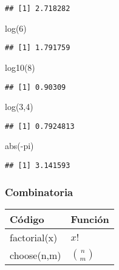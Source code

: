 \documentclass[
]{article}
\newenvironment{Shaded}{\begin{snugshade}}{\end{snugshade}}
\newcommand{\DecValTok}[1]{\textcolor[rgb]{0.00,0.00,0.81}{#1}}
\newcommand{\FunctionTok}[1]{\textcolor[rgb]{0.00,0.00,0.00}{#1}}
\newcommand{\NormalTok}[1]{#1}
\newcommand{\SpecialCharTok}[1]{\textcolor[rgb]{0.00,0.00,0.00}{#1}}
\begin{document}
\begin{verbatim}
## [1] 2.718282
\end{verbatim}

\begin{Shaded}
\begin{Highlighting}[]
\FunctionTok{log}\NormalTok{(}\DecValTok{6}\NormalTok{)}
\end{Highlighting}
\end{Shaded}

\begin{verbatim}
## [1] 1.791759
\end{verbatim}

\begin{Shaded}
\begin{Highlighting}[]
\FunctionTok{log10}\NormalTok{(}\DecValTok{8}\NormalTok{)}
\end{Highlighting}
\end{Shaded}

\begin{verbatim}
## [1] 0.90309
\end{verbatim}

\begin{Shaded}
\begin{Highlighting}[]
\FunctionTok{log}\NormalTok{(}\DecValTok{3}\NormalTok{,}\DecValTok{4}\NormalTok{)}
\end{Highlighting}
\end{Shaded}

\begin{verbatim}
## [1] 0.7924813
\end{verbatim}

\begin{Shaded}
\begin{Highlighting}[]
\FunctionTok{abs}\NormalTok{(}\SpecialCharTok{{-}}\NormalTok{pi)}
\end{Highlighting}
\end{Shaded}

\begin{verbatim}
## [1] 3.141593
\end{verbatim}

\hypertarget{combinatoria}{%
\subsubsection{Combinatoria}\label{combinatoria}}

\begin{longtable}[]{@{}ll@{}}
\toprule()
Código & Función \\
\midrule()
\endhead
factorial(x) & \(x!\) \\
choose(n,m) & \(\binom{n}{m}\) \\
\bottomrule()
\end{longtable}
\end{document}
